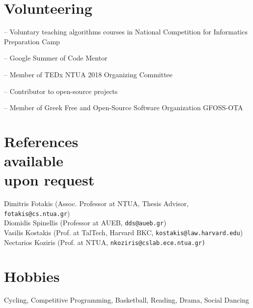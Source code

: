 \documentclass[margin]{res}
\newcommand{\field}[2]{\noindent \textbf{#1} \hfill #2 \\}
\begin{document}
\begin{resume}
\section{Volunteering} 
\begin{compactitem}
    \item[--] Voluntary teaching algorithms courses in National Competition for Informatics Preparation Camp 
    \item[--] Google Summer of Code Mentor
    \item[--] Member of TEDx NTUA 2018 Organizing Committee 
    \item[--] Contributor to open-source projects
    \item[--] Member of Greek Free and Open-Source Software Organization GFOSS-OTA

\end{compactitem}

\section{References \\ available \\ upon request}
Dimitris Fotakis \hfill (Assoc. Professor at NTUA, Thesis Advisor, \texttt{fotakis@cs.ntua.gr}) \\
Diomidis Spinellis \hfill (Professor at AUEB, \texttt{dds@aueb.gr}) \\
Vasilis Kostakis \hfill (Prof. at TalTech, Harvard BKC, \texttt{kostakis@law.harvard.edu}) \\
Nectarios Koziris \hfill (Prof. at NTUA, \texttt{nkoziris@cslab.ece.ntua.gr)}

\section{Hobbies}
Cycling, Competitive Programming, Basketball, Reading, Drama, Social Dancing


\begin{comment}

\section{Selected \\ Projects \& Published \\ Software} 

\field{SADE} {\emph{August 2018 --}}
This project aims to perform software clusterings using vector semantics and the call graphs. The project had successfull results on recovering clusters of the Linux Kernel.\\
Repository: \url{https://github.com/papachristoumarios/sade}


\end{comment}
\end{resume}
\end{document}
